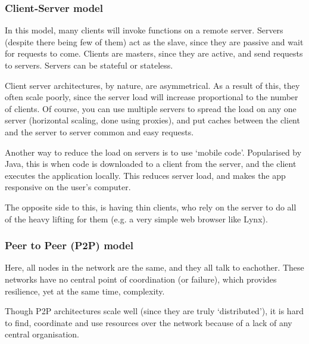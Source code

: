 \subsubsection{Client-Server model}

In this model, many clients will invoke functions on a remote server. Servers
(despite there being few of them) act as the slave, since they are passive and
wait for requests to come. Clients are masters, since they are active, and send
requests to servers. Servers can be stateful or stateless.

Client server architectures, by nature, are asymmetrical. As a result of this,
they often scale poorly, since the server load will increase proportional to the
number of clients. Of course, you can use multiple servers to spread the load on
any one server (horizontal scaling, done using proxies), and put caches between
the client and the server to server common and easy requests.

Another way to reduce the load on servers is to use `mobile code'. Popularised
by Java, this is when code is downloaded to a client from the server, and the
client executes the application locally. This reduces server load, and makes the
app responsive on the user's computer.

The opposite side to this, is having thin clients, who rely on the server to do
all of the heavy lifting for them (e.g. a very simple web browser like Lynx).

\subsubsection{Peer to Peer (P2P) model}

Here, all nodes in the network are the same, and they all talk to eachother.
These networks have no central point of coordination (or failure), which
provides resilience, yet at the same time, complexity.

Though P2P architectures scale well (since they are truly `distributed'), it is
hard to find, coordinate and use resources over the network because of a lack of
any central organisation.

